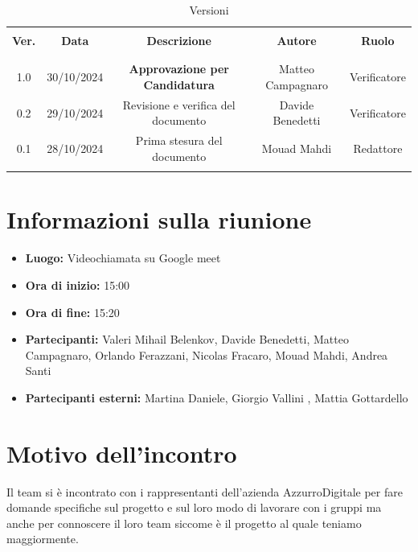 \documentclass[italian, 12pt]{article}
\begin{document}
\pagestyle{mystyle}


\begin{table}[!h]
	\caption{Versioni}
	\begin{center}
		\begin{tabular}{ c c c c c}
			\hline \\[-2ex]
			\textbf{Ver.} & \textbf{Data} & \textbf{Descrizione} & \textbf{Autore} & \textbf{Ruolo}  \\
			\\[-2ex] \hline \\[-1.5ex]
            1.0 & 30/10/2024 & \textbf{Approvazione per Candidatura} & Matteo Campagnaro & Verificatore\\
            0.2 & 29/10/2024 & Revisione e verifica del documento & Davide Benedetti & Verificatore\\
			0.1 & 28/10/2024 & Prima stesura del documento & Mouad Mahdi & Redattore\\
			\\[-1.5ex] \hline
		\end{tabular}
	\end{center}
\end{table}


\tableofcontents
\newpage


\section{Informazioni sulla riunione}
\begin{itemize}
    \item \textbf{Luogo:} Videochiamata su Google meet
    \item \textbf{Ora di inizio:} 15:00
    \item \textbf{Ora di fine:} 15:20
    \item \textbf{Partecipanti:} Valeri Mihail Belenkov, Davide Benedetti, Matteo Campagnaro, Orlando Ferazzani, Nicolas Fracaro, Mouad Mahdi, Andrea Santi 
    \item \textbf{Partecipanti esterni:} Martina Daniele, Giorgio Vallini , Mattia Gottardello
\end{itemize}

\section{Motivo dell'incontro}
Il team si è incontrato con i rappresentanti dell'azienda AzzurroDigitale per fare domande specifiche sul progetto e sul loro modo di lavorare con i gruppi ma anche per connoscere il loro team siccome è il progetto al quale teniamo maggiormente.
\end{document}
